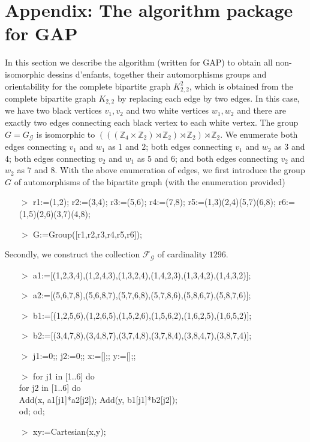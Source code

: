 \documentclass[12pt]{amsart}
\theoremstyle{remark}
\begin{document}
\section{Appendix: The algorithm package for GAP}\label{Sec:appendix}
In this section we describe the algorithm (written for GAP) to obtain all non-isomorphic dessins d'enfants, together their automorphisms groups and orientability for the complete bipartite graph $K_{2,2}^{2}$, which is obtained from the complete bipartite graph $K_{2,2}$ by replacing each edge by two edges. In this case, we have two black vertices $v_{1},v_{2}$ and two white vertices $w_{1},w_{2}$ and there are exactly two edges connecting each black vertex to each white vertex. The group $G=G_{\mathcal G}$ is isomorphic to $((({\mathbb Z}_{4} \times {\mathbb Z}_{2}) \rtimes {\mathbb Z}_{2}) \rtimes {\mathbb Z}_{2}) \rtimes {\mathbb Z}_{2}$.
We enumerate both edges connecting $v_{1}$ and $w_{1}$ as $1$ and $2$; both edges connecting $v_{1}$ and $w_{2}$ as $3$ and $4$; both edges connecting $v_{2}$ and $w_{1}$ as $5$ and $6$;  and both edges connecting $v_{2}$ and $w_{2}$ as $7$ and $8$. With the above enumeration of edges, we first introduce the group $G$ of automorphisms of the bipartite graph (with the enumeration provided)
\begin{enumerate}
\item[$>$] r1:=(1,2); r2:=(3,4); r3:=(5,6); r4:=(7,8); r5:=(1,3)(2,4)(5,7)(6,8); r6:=(1,5)(2,6)(3,7)(4,8);
\item[$>$] G:=Group([r1,r2,r3,r4,r5,r6]);
\end{enumerate}

Secondly, we construct the collection ${\mathcal F}_{\mathcal G}$ of cardinality $1296$.

\begin{enumerate}
\item[$>$] a1:=[(1,2,3,4),\;(1,2,4,3),\;(1,3,2,4),\;(1,4,2,3),\;(1,3,4,2),\;(1,4,3,2)];

\item[$>$] a2:=[(5,6,7,8),\;(5,6,8,7),\;(5,7,6,8),\;(5,7,8,6),\;(5,8,6,7),\;(5,8,7,6)];

\item[$>$] b1:=[(1,2,5,6),\;(1,2,6,5),\;(1,5,2,6),\;(1,5,6,2),\;(1,6,2,5),\;(1,6,5,2)];

\item[$>$] b2:=[(3,4,7,8),\;(3,4,8,7),\;(3,7,4,8),\;(3,7,8,4),\;(3,8,4,7),\;(3,8,7,4)];

\item[$>$] j1:=0;; j2:=0;; x:=[];; y:=[];;

\item[$>$]  for j1 in [1..6] do \\
for j2 in [1..6] do \\
Add(x, a1[j1]*a2[j2]); Add(y, b1[j1]*b2[j2]);\\
od;
od;

\item[$>$] xy:=Cartesian(x,y);

\end{enumerate}
\end{document}
